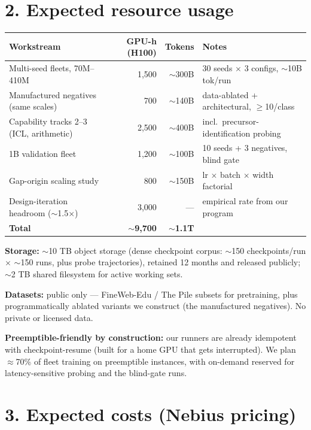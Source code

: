 \documentclass[11pt]{article}
\begin{document}
\section*{2. Expected resource usage}

\begin{center}\footnotesize
\begin{tabular}{@{}lrrp{5.3cm}@{}}
\toprule
Workstream & GPU-h (H100) & Tokens & Notes \\
\midrule
Multi-seed fleets, 70M--410M & 1{,}500 & $\sim$300B & 30 seeds $\times$ 3 configs, $\sim$10B tok/run \\
Manufactured negatives (same scales) & 700 & $\sim$140B & data-ablated + architectural, $\geq$10/class \\
Capability tracks 2--3 (ICL, arithmetic) & 2{,}500 & $\sim$400B & incl.\ precursor-identification probing \\
1B validation fleet & 1{,}200 & $\sim$100B & 10 seeds + 3 negatives, blind gate \\
Gap-origin scaling study & 800 & $\sim$150B & lr $\times$ batch $\times$ width factorial \\
Design-iteration headroom ($\sim$1.5$\times$) & 3{,}000 & --- & empirical rate from our program \\
\midrule
\textbf{Total} & \textbf{$\sim$9{,}700} & \textbf{$\sim$1.1T} & \\
\bottomrule
\end{tabular}
\end{center}

\textbf{Storage:} $\sim$10 TB object storage (dense checkpoint corpus: $\sim$150
checkpoints/run $\times$ $\sim$150 runs, plus probe trajectories), retained 12 months and
released publicly; $\sim$2 TB shared filesystem for active working sets.

\textbf{Datasets:} public only --- FineWeb-Edu / The Pile subsets for pretraining, plus
programmatically ablated variants we construct (the manufactured negatives). No private
or licensed data.

\textbf{Preemptible-friendly by construction:} our runners are already idempotent with
checkpoint-resume (built for a home GPU that gets interrupted). We plan
$\approx$70\% of fleet training on preemptible instances, with on-demand reserved for
latency-sensitive probing and the blind-gate runs.

\section*{3. Expected costs (Nebius pricing)}
\end{document}
